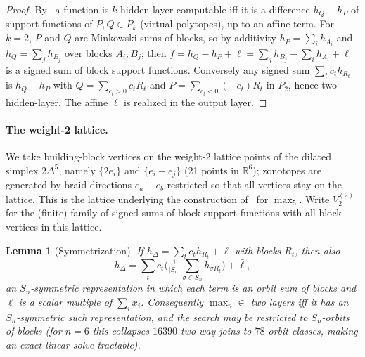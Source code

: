 \documentclass[11pt]{article}
\newtheorem{lemma}{Lemma}
\theoremstyle{definition}
\newcommand{\RR}{\mathbb{R}}
\begin{document}
\begin{proof}
By~\cite{ABMM,HHL} a function is $k$-hidden-layer computable iff it is a difference $h_Q-h_P$ of support
functions of $P,Q\in P_k$ (virtual polytopes), up to an affine term. For $k=2$, $P$ and $Q$ are Minkowski
sums of blocks, so by additivity $h_P=\sum_i h_{A_i}$ and $h_Q=\sum_j h_{B_j}$ over blocks $A_i,B_j$; then
$f=h_Q-h_P+\ell=\sum_j h_{B_j}-\sum_i h_{A_i}+\ell$ is a signed sum of block support functions. Conversely
any signed sum $\sum_t c_t h_{R_t}$ is $h_Q-h_P$ with $Q=\sum_{c_t>0}c_t R_t$ and $P=\sum_{c_t<0}(-c_t)R_t$
in $P_2$, hence two-hidden-layer. The affine $\ell$ is realized in the output layer.
\end{proof}

\paragraph{The weight-2 lattice.} We take building-block vertices on the weight-2 lattice points of the
dilated simplex $2\Delta^{5}$, namely $\{2e_i\}$ and $\{e_i+e_j\}$ (21 points in $\RR^6$); zonotopes are
generated by braid directions $e_a-e_b$ restricted so that all vertices stay on the lattice. This is the
lattice underlying the construction of~\cite{BBHSY} for $\max_5$. Write $V_2^{(2)}$ for the (finite) family
of signed sums of block support functions with all block vertices in this lattice.

\begin{lemma}[Symmetrization]\label{lem:sym}
If $h_\Delta=\sum_t c_t h_{R_t}+\ell$ with blocks $R_t$, then also
\[
  h_\Delta=\sum_t c_t\Big(\tfrac{1}{|S_n|}\sum_{\sigma\in S_n} h_{\sigma R_t}\Big)+\bar\ell,
\]
an $S_n$-symmetric representation in which each term is an orbit sum of blocks and $\bar\ell$ is a scalar
multiple of $\sum_i x_i$. Consequently $\max_n\in$ two layers iff it has an $S_n$-symmetric such
representation, and the search may be restricted to $S_n$-orbits of blocks (for $n=6$ this collapses
$16390$ two-way joins to $78$ orbit classes, making an exact linear solve tractable).
\end{lemma}
\end{document}
